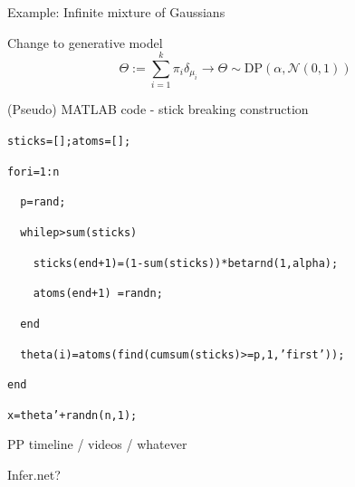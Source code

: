 \begin{frame}{Example: Infinite mixture of Gaussians}
  \begin{block}{Change to generative model}
    \begin{equation*}
      \Theta := \sum_{i=1}^k \pi_i \delta_{\mu_i} \to \Theta \sim \textrm{DP}(\alpha, \mathcal{N}(0,1))
    \end{equation*}
  \end{block}
  \begin{block}{(Pseudo) MATLAB code - stick breaking construction}
    \begin{alltt}
      sticks = []; atoms = [];
      
      for i = 1:n
      
      \ \ p = rand;
      
      \ \ while p > sum(sticks)
      
      \ \ \ \ sticks(end+1) = (1-sum(sticks)) * betarnd(1, alpha);
      
      \ \ \ \ atoms(end+1) \ = randn;
      
      \ \ end
      
      \ \ theta(i) = atoms(find(cumsum(sticks)>=p, 1, 'first'));
      
      end

      x = theta' + randn(n, 1);
    \end{alltt}
  \end{block}
\end{frame}

\begin{frame}{PP timeline / videos / whatever}

Infer.net?
\end{frame}




